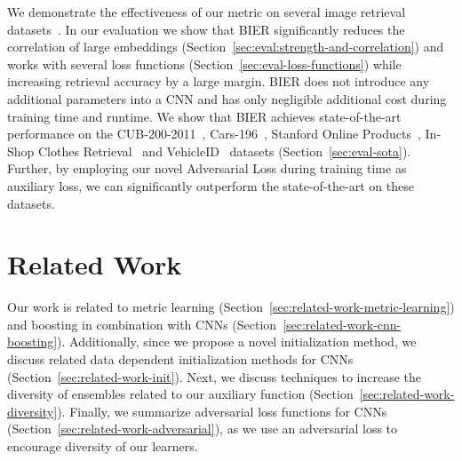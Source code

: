 \documentclass[10pt,journal,compsoc]{IEEEtran}
\begin{document}
We demonstrate the effectiveness of our metric on several image retrieval
datasets~\cite{krause20133d, liu2016deep, liu2016deepfashion, oh2016deep, WahCUB_200_2011}.
In our evaluation we show that \ac{BIER} 
significantly reduces the correlation of large embeddings (Section~\ref{sec:eval:strength-and-correlation}) 
and works with several loss functions (Section~\ref{sec:eval-loss-functions}) 
while increasing retrieval accuracy by a large margin.
\ac{BIER} does not introduce any additional parameters into a \ac{CNN} and has only negligible additional cost during training time and runtime. 
We show that \ac{BIER} achieves
state-of-the-art performance on the
CUB-200-2011~\cite{WahCUB_200_2011}, Cars-196~\cite{krause20133d}, Stanford
Online Products~\cite{oh2016deep}, In-Shop Clothes Retrieval~\cite{liu2016deepfashion} and VehicleID~\cite{liu2016deep} datasets (Section~\ref{sec:eval-sota}).
Further, by employing our novel Adversarial Loss during training time as auxiliary loss, we can significantly outperform the state-of-the-art on these datasets.

\section{Related Work}\label{sec:related-work}

Our work is related to metric learning (Section~\ref{sec:related-work-metric-learning}) and boosting in
combination with \acp{CNN} (Section~\ref{sec:related-work-cnn-boosting}). Additionally, since we propose a novel initialization
method, we discuss related data dependent initialization methods for
\acp{CNN} (Section~\ref{sec:related-work-init}). 
Next, we discuss techniques to increase the diversity of ensembles related to our auxiliary function (Section~\ref{sec:related-work-diversity}). 
Finally, we summarize adversarial loss functions for \acp{CNN} (Section~\ref{sec:related-work-adversarial}), 
as we use an adversarial loss to encourage diversity of our learners.
\end{document}
